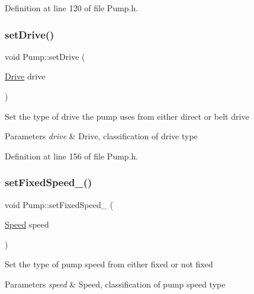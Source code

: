 Definition at line 120 of file Pump.\+h.

\mbox{\label{class_pump_a54b6fc1aa44cc8377914ccb94738723a}} 
\subsubsection{\texorpdfstring{set\+Drive()}{setDrive()}}
{\footnotesize\ttfamily void Pump\+::set\+Drive (\begin{DoxyParamCaption}\item[{\hyperlink{class_pump_a32bf0ade131a11bb3b3fb374f638e983}{Drive}}]{drive }\end{DoxyParamCaption})\hspace{0.3cm}{\ttfamily [inline]}}

Set the type of drive the pump uses from either direct or belt drive


\begin{DoxyParams}{Parameters}
{\em drive} & Drive, classification of drive type \\
\hline
\end{DoxyParams}


Definition at line 156 of file Pump.\+h.

\mbox{\label{class_pump_a9e74b484f468a14076fb12d8b991e24b}} 
\subsubsection{\texorpdfstring{set\+Fixed\+Speed\+\_\+()}{setFixedSpeed\_()}}
{\footnotesize\ttfamily void Pump\+::set\+Fixed\+Speed\+\_\+ (\begin{DoxyParamCaption}\item[{\hyperlink{class_pump_ae443603074ebca82f0b89209482d10b6}{Speed}}]{speed }\end{DoxyParamCaption})\hspace{0.3cm}{\ttfamily [inline]}}

Set the type of pump speed from either fixed or not fixed


\begin{DoxyParams}{Parameters}
{\em speed} & Speed, classification of pump speed type \\
\hline
\end{DoxyParams}


